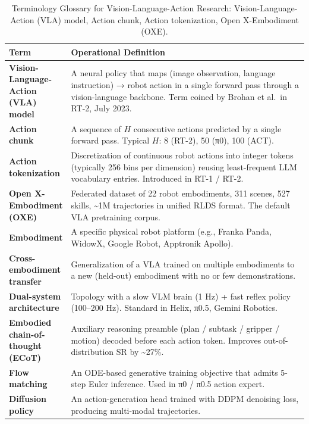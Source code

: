 \documentclass{article}
\begin{document}
\begin{table}[t]
\centering
\caption{Terminology Glossary for Vision-Language-Action Research: Vision-Language-Action (VLA) model, Action chunk, Action tokenization, Open X-Embodiment (OXE).}
\label{tab:terminology-glossary-for-vision-language-action-research}
\begin{tabular}{>{\raggedright\arraybackslash}p{0.1652\linewidth}
  >{\raggedright\arraybackslash}p{0.8348\linewidth}}
\toprule
Term & Operational Definition \\
\midrule
\textbf{Vision-Language-Action (VLA) model} & A neural policy that maps (image observation, language instruction) → robot action in a single forward pass through a vision-language backbone. Term coined by Brohan et al.~in RT-2, July 2023. \\
\textbf{Action chunk} & A sequence of \(H\) consecutive actions predicted by a single forward pass. Typical \(H\): 8 (RT-2), 50 (π0), 100 (ACT). \\
\textbf{Action tokenization} & Discretization of continuous robot actions into integer tokens (typically 256 bins per dimension) reusing least-frequent LLM vocabulary entries. Introduced in RT-1 / RT-2. \\
\textbf{Open X-Embodiment (OXE)} & Federated dataset of 22 robot embodiments, 311 scenes, 527 skills, \textasciitilde1M trajectories in unified RLDS format. The default VLA pretraining corpus. \\
\textbf{Embodiment} & A specific physical robot platform (e.g., Franka Panda, WidowX, Google Robot, Apptronik Apollo). \\
\textbf{Cross-embodiment transfer} & Generalization of a VLA trained on multiple embodiments to a new (held-out) embodiment with no or few demonstrations. \\
\textbf{Dual-system architecture} & Topology with a slow VLM brain (1 Hz) + fast reflex policy (100--200 Hz). Standard in Helix, π0.5, Gemini Robotics. \\
\textbf{Embodied chain-of-thought (ECoT)} & Auxiliary reasoning preamble (plan / subtask / gripper / motion) decoded before each action token. Improves out-of-distribution SR by \textasciitilde27\%. \\
\textbf{Flow matching} & An ODE-based generative training objective that admits 5-step Euler inference. Used in π0 / π0.5 action expert. \\
\textbf{Diffusion policy} & An action-generation head trained with DDPM denoising loss, producing multi-modal trajectories. \\

\end{tabular}
\end{table}
\end{document}
